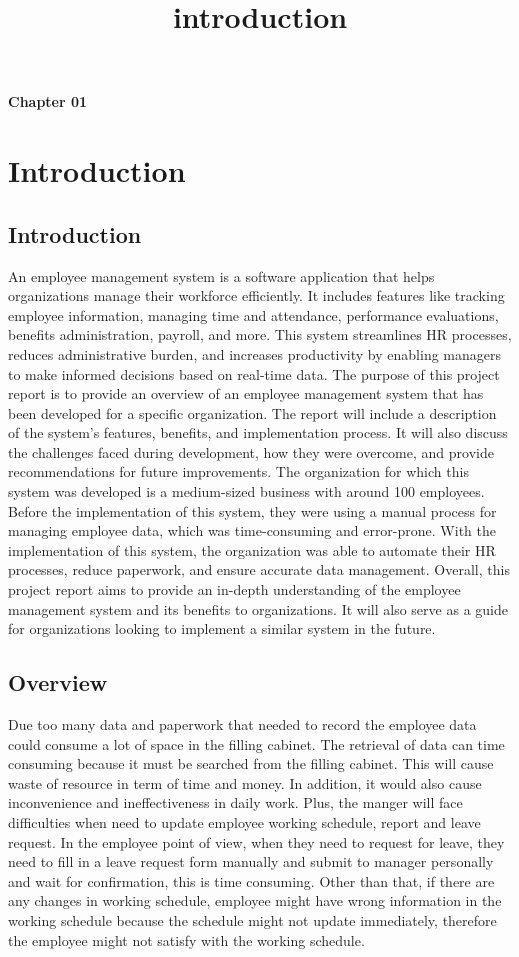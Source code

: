 \title{introduction}
\begin{center}
\textbf{Chapter 01}\\
\vspace{2.5mm}
   \section{ \large \textbf{Introduction}}
\end{center}
\vspace{5.5mm}
    \subsection{Introduction}
An employee management system is a software application that helps organizations manage their workforce efficiently. It includes features like tracking employee information, managing time and attendance, performance evaluations, benefits administration, payroll, and more. This system streamlines HR processes, reduces administrative burden, and increases productivity by enabling managers to make informed decisions based on real-time data. The purpose of this project report is to provide an overview of an employee management system that has been developed for a specific organization. The report will include a description of the system's features, benefits, and implementation process. It will also discuss the challenges faced during development, how they were overcome, and provide recommendations for future improvements. The organization for which this system was developed is a medium-sized business with around 100 employees. Before the implementation of this system, they were using a manual process for managing employee data, which was time-consuming and error-prone. With the implementation of this system, the organization was able to automate their HR processes, reduce paperwork, and ensure accurate data management. Overall, this project report aims to provide an in-depth understanding of the employee management system and its benefits to organizations. It will also serve as a guide for organizations looking to implement a similar system in the future.
\subsection{Overview}
Due too many data and paperwork that needed to record the employee data could consume a lot of space in the filling cabinet. The retrieval of data can time consuming because it must be searched from the filling cabinet. This will cause waste of resource in term of time and money. In addition, it would also cause inconvenience and ineffectiveness in daily work. Plus, the manger will face difficulties when need to update employee working schedule, report and leave request. In the employee point of view, when they need to request for leave, they need to fill in a leave request form manually and submit to manager personally and wait for confirmation, this is time consuming. Other than that, if there are any changes in working schedule, employee might have wrong information in the working schedule because the schedule might not update immediately, therefore the employee might not satisfy with the working schedule.
